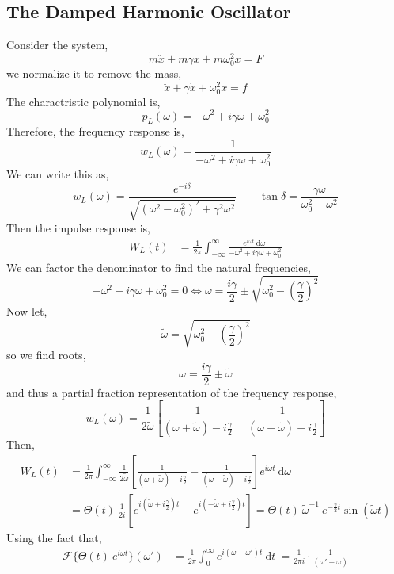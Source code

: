 \documentclass[12pt]{extarticle}
\renewcommand{\d}[1]{ \mathrm{d}#1 \:}
\theoremstyle{definition}
\newcommand{\F}{\mathcal{F}}
\begin{document}
\subsection{The Damped Harmonic Oscillator}

Consider the system,
\[ m \ddot{x} + m \gamma \dot{x} + m \omega_0^2 x = F \]
we normalize it to remove the mass,
\[ \ddot{x} + \gamma \dot{x} + \omega_0^2 x = f \]
The charactristic polynomial is,
\[ p_L(\omega) = - \omega^2 + i  \gamma \omega +  \omega_0^2 \]
Therefore, the frequency response is,
\[ w_L(\omega) = \frac{1}{- \omega^2 + i \gamma \omega + \omega_0^2} \]
We can write this as,
\[ w_L(\omega) = \frac{e^{-i \delta}}{\sqrt{(\omega^2 - \omega_0^2)^2 + \gamma^2 \omega^2}} \quad \quad \tan{\delta} = \frac{\gamma \omega}{\omega_0^2 - \omega^2} \]
Then the impulse response is,
\begin{align*}
W_L(t) & = \frac{1}{2 \pi} \int_{-\infty}^{\infty} \frac{e^{i \omega t} \: \d{\omega} }{- \omega^2 + i \gamma \omega + \omega_0^2} 
\end{align*}
We can factor the denominator to find the natural frequencies,
\[ -\omega^2 + i \gamma \omega + \omega_0^2 = 0 \iff \omega = \frac{i \gamma}{2} \pm \sqrt{\omega_0^2 - \left( \frac{\gamma}{2} \right)^2 }  \]
Now let,
\[ \tilde{\omega} = \sqrt{\omega_0^2 - \left( \frac{\gamma}{2} \right)^2 } \]
so we find roots,
\[ \omega = \frac{i \gamma}{2} \pm \tilde{\omega} \]
and thus a partial fraction representation of the frequency response,
\[ w_L(\omega) = \frac{1}{2 \tilde{\omega}} \left[ \frac{1}{(\omega + \tilde{\omega}) - i \frac{\gamma}{2}} - \frac{1}{(\omega - \tilde{\omega}) - i \frac{\gamma}{2}} \right] \]
Then,
\begin{align*}
W_L(t) & = \frac{1}{2\pi} \int_{-\infty}^{\infty} \frac{1}{2 \tilde{\omega}}   \left[ \frac{1}{(\omega + \tilde{\omega}) - i \frac{\gamma}{2}} - \frac{1}{(\omega - \tilde{\omega}) - i \frac{\gamma}{2}} \right] e^{i \omega t} \: \d{\omega}
\\
& = \Theta(t) \: \frac{1}{2 i } [ e^{i(\tilde{\omega} + i \frac{\gamma}{2}) t} - e^{i(-\tilde{\omega} + i \frac{\gamma}{2}) t} ] =  \Theta(t) \: \tilde{\omega}^{-1} \: e^{- \frac{\gamma}{2} t} \sin{(\tilde{\omega} t)}
\end{align*}
Using the fact that,
\begin{align*}
\F \{ \Theta(t) \: e^{i \omega t} \}(\omega') & = \frac{1}{2 \pi} \int_{0}^{\infty}  e^{i (\omega - \omega') t} \: \d{t} = \frac{1}{2 \pi i} \cdot \frac{1}{( \omega' - \omega)} 
\end{align*}
\end{document}
